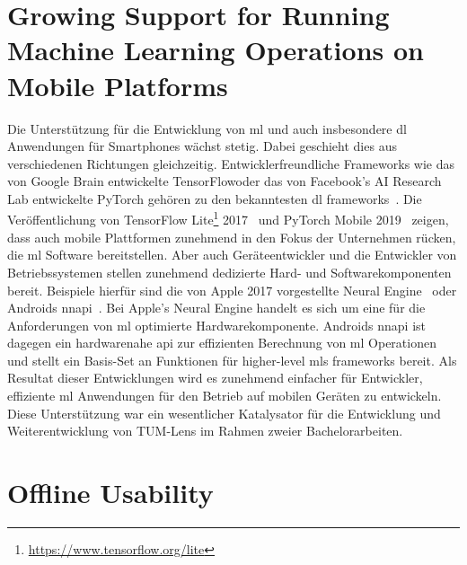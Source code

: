 \documentclass[
			   fontsize=11pt,
               paper=a4,
               bibliography=totoc,
               idxtotoc,
               headsepline,
               footsepline,
               footinclude=false,
               BCOR=12mm,
               DIV=13,
               openany,   %
               ]
               {scrbook}
\begin{document}
\section{Growing Support for Running Machine Learning Operations on Mobile Platforms}

Die Unterstützung für die Entwicklung von \gls{ml} und auch insbesondere \gls{dl} Anwendungen für Smartphones wächst stetig. Dabei geschieht dies aus verschiedenen Richtungen gleichzeitig. Entwicklerfreundliche Frameworks wie das von Google Brain entwickelte TensorFlowoder das von Facebook's AI Research Lab entwickelte PyTorch gehören zu den bekanntesten \gls{dl} frameworks~\cite{dl_ranking_2018}. Die Veröffentlichung von TensorFlow Lite\footnote{\url{https://www.tensorflow.org/lite}} 2017~\cite{tflite_release_verge_2017} und PyTorch Mobile 2019~\cite{pytorch_release_2019} zeigen, dass auch mobile Plattformen zunehmend in den Fokus der Unternehmen rücken, die \acrlong{ml} Software bereitstellen. Aber auch Geräteentwickler und die Entwickler von Betriebssystemen stellen zunehmend dedizierte Hard- und Softwarekomponenten bereit. Beispiele hierfür sind die von Apple 2017 vorgestellte Neural Engine~\cite{neural_engine_verge_2017} oder Androids \gls{nnapi}~\cite{nnapi_devguide_2021}. Bei Apple's Neural Engine handelt es sich um eine für die Anforderungen von \acrlong{ml} optimierte Hardwarekomponente. Androids \gls{nnapi} ist dagegen ein hardwarenahe \gls{api} zur effizienten Berechnung von \gls{ml} Operationen und stellt ein Basis-Set an Funktionen für higher-level \glspl{ml} frameworks bereit. Als Resultat dieser Entwicklungen wird es zunehmend einfacher für Entwickler, effiziente \gls{ml} Anwendungen für den Betrieb auf mobilen Geräten zu entwickeln. Diese Unterstützung war ein wesentlicher Katalysator für die Entwicklung und Weiterentwicklung von TUM-Lens im Rahmen zweier Bachelorarbeiten.

\section{Offline Usability}
\end{document}
